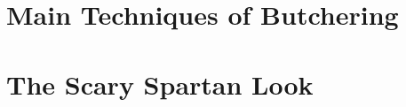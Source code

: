 \documentclass[preprint,10pt,nonatbib]{sigplanconf}
\begin{document}
\balance
\small


\eject
\appendix
\section{Main Techniques of Butchering}
\label{section:techniques}


\section{The Scary Spartan Look}
\label{section:look}

\end{document}
